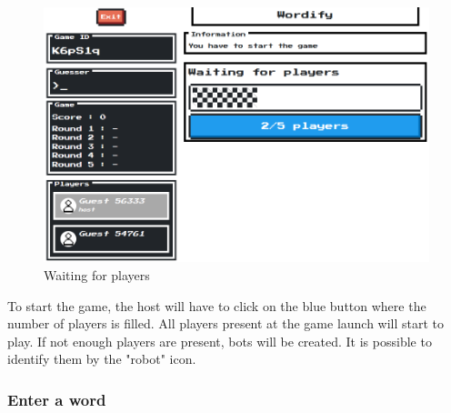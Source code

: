 \documentclass{tnreport}
\begin{document}
\begin{figure}[ht]
	\centering
	\fboxsep=1.2pt
	\includegraphics[scale=0.53]{figures/waiting_players}
	\caption{Waiting for players}
	\label{fig:waiting_players}
\end{figure} 

To start the game, the host will have to click on the blue button where the number of players is filled. All players present at the game launch will start to play. If not enough players are present, bots will be created. It is possible to identify them by the "robot" icon. 

\subsubsection{Enter a word}
\end{document}
